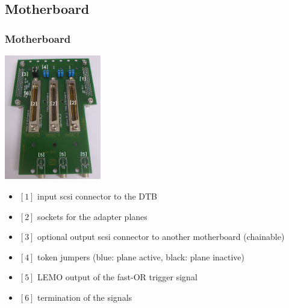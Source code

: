 \documentclass[9pt]{beamer}
\begin{document}
\subsection{Motherboard}
\begin{frame}
	\frametitle{Motherboard}
	\begin{center}
		\begin{minipage}{4.5cm}
			\centering
			\includegraphics[width=4.2cm]{Pics/mb2}
		\end{minipage}
		\hspace*{2pt}
		\begin{minipage}{6cm}
			\begin{itemize}
				\item $[1]$ input scsi connector to the DTB
				\item $[2]$ sockets for the adapter planes
				\item $[3]$ optional output scsi connector to another motherboard (chainable)
				\item $[4]$ token jumpers (blue: plane active, black: plane inactive) 
				\item $[5]$ LEMO output of the fast-OR trigger signal 
				\item $[6]$ termination of the signals
			\end{itemize}
		\end{minipage}\no\s
	\end{center}
\end{frame}
\end{document}

